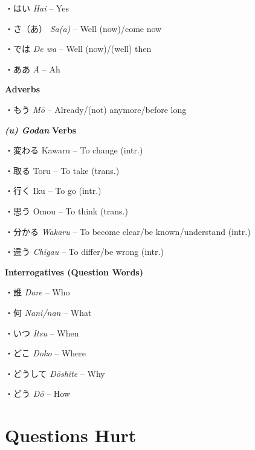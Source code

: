 \par{・はい \emph{Hai }– Yes }

\par{・さ（あ） \emph{Sa(a) }– Well (now)\slash come now }

\par{・では \emph{De wa }– Well (now)\slash (well) then }

\par{・ああ \emph{Ā }– Ah }

\par{\textbf{Adverbs }}

\par{・もう \emph{Mō }– Already\slash (not) anymore\slash before long }

\par{\textbf{\emph{ (u) Godan }}\textbf{Verbs }}

\par{・変わる Kawaru – To change (intr.) }

\par{・取る Toru – To take (trans.) }

\par{・行く Iku – To go (intr.) }

\par{・思う Omou – To think (trans.) }

\par{・分かる \emph{Wakaru }– To become clear\slash be known\slash understand (intr.) }

\par{・違う \emph{Chigau }– To differ\slash be wrong (intr.) }

\par{\textbf{Interrogatives (Question Words) }}

\par{・誰 \emph{Dare }– Who }

\par{・何 \emph{Nani\slash nan }– What }

\par{・いつ \emph{Itsu }– When }

\par{・どこ \emph{Doko }– Where }

\par{・どうして \emph{Dōshite }– Why }

\par{・どう \emph{Dō }– How }
      
\section{Questions Hurt}
 
